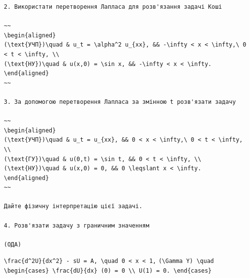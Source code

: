 \documentclass[
  ukrainian,
]{article}
\begin{document}
\begin{verbatim}
2. Використати перетворення Лапласа для розв'язання задачі Коші

~~
\begin{aligned}
(\text{УЧП})\quad & u_t = \alpha^2 u_{xx}, && -\infty < x < \infty,\ 0 < t < \infty, \\
(\text{НУ})\quad & u(x,0) = \sin x, && -\infty < x < \infty.
\end{aligned}
~~

3. За допомогою перетворення Лапласа за змінною t розв'язати задачу

~~
\begin{aligned}
(\text{УЧП})\quad & u_t = u_{xx}, && 0 < x < \infty,\ 0 < t < \infty, \\
(\text{ГУ})\quad & u(0,t) = \sin t, && 0 < t < \infty, \\
(\text{НУ})\quad & u(x,0) = 0, && 0 \leqslant x < \infty.
\end{aligned}
~~

Дайте фізичну інтерпретацію цієї задачі.

4. Розв'язати задачу з граничним значенням

(ОДА)
\end{verbatim}

\texttt{\textbackslash{}frac\{d\^{}2U\}\{dx\^{}2\}\ -\ sU\ =\ A,\ \textbackslash{}quad\ 0\ \textless{}\ x\ \textless{}\ 1,}
\texttt{(\textbackslash{}Gamma\ Y)\ \textbackslash{}quad}
\texttt{\textbackslash{}begin\{cases\}\ \textbackslash{}frac\{dU\}\{dx\}\ (0)\ =\ 0\ \textbackslash{}\textbackslash{}\ U(1)\ =\ 0.\ \textbackslash{}end\{cases\}}
\end{document}
